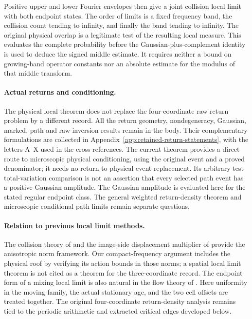 \documentclass[11pt,reqno]{amsart}
\numberwithin{equation}{section}
\theoremstyle{definition}\newtheorem{definition}[theorem]{Definition}
\theoremstyle{remark}\newtheorem{remark}[theorem]{Remark}
\begin{document}
Positive upper and lower Fourier envelopes then give a joint collision
local limit with both endpoint states. The order of limits is a fixed
frequency band, the collision count tending to infinity, and finally
the band tending to infinity. The original physical overlap is a
legitimate test of the resulting local measure. This evaluates the
complete probability before the Gaussian-plus-complement identity is
used to deduce the signed middle estimate. It requires neither a bound
on growing-band operator constants nor an absolute estimate for the
modulus of that middle transform.

\paragraph{Actual returns and conditioning.}
The physical local theorem does not replace the four-coordinate raw
return problem by a different record. All the return geometry,
nondegeneracy, Gaussian, marked, path and raw-inversion results remain
in the body. Their complementary formulations are collected in
Appendix~\ref{app:retained-return-statements}, with the letters A--X
used in the cross-references. The current theorem provides a direct
route to microscopic physical conditioning, using the original event
and a proved denominator; it needs no return-to-physical event
replacement. Its arbitrary-test total-variation comparison is not an
assertion that every selected path event has a positive Gaussian
amplitude. The Gaussian amplitude is evaluated here for the stated
regular endpoint class. The general weighted return-density theorem
and microscopic conditional path limits remain separate questions.

\paragraph{Relation to previous local limit methods.}
The collision theory of \cite{DZ11,DZ} and the image-side displacement
multiplier of \cite{DPZ} provide the anisotropic norm framework.
Our compact-frequency argument includes the physical roof by verifying
its action bounds in those norms; a spatial local limit theorem is not
cited as a theorem for the three-coordinate record. The endpoint form
of a mixing local limit is also natural in the flow theory of
\cite{DN}. Here uniformity in the moving family, the actual stationary
age, and the two cell offsets are treated together. The original
four-coordinate return-density analysis remains tied to the periodic
arithmetic and extracted critical edges developed below.
\end{document}
